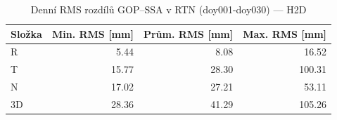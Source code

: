\begin{table}[H]
\centering
\caption{Denní RMS rozdílů GOP–SSA v RTN (doy001-doy030) — H2D}
\label{tab:gop_vs_ssa_h2d_doy001-doy030_rms}
\begin{tabular}{lrrr}
\toprule
Složka & Min. RMS [mm] & Prům. RMS [mm] & Max. RMS [mm] \\
\midrule
R & 5.44 & 8.08 & 16.52 \\
T & 15.77 & 28.30 & 100.31 \\
N & 17.02 & 27.21 & 53.11 \\
3D & 28.36 & 41.29 & 105.26 \\
\bottomrule
\end{tabular}
\end{table}
